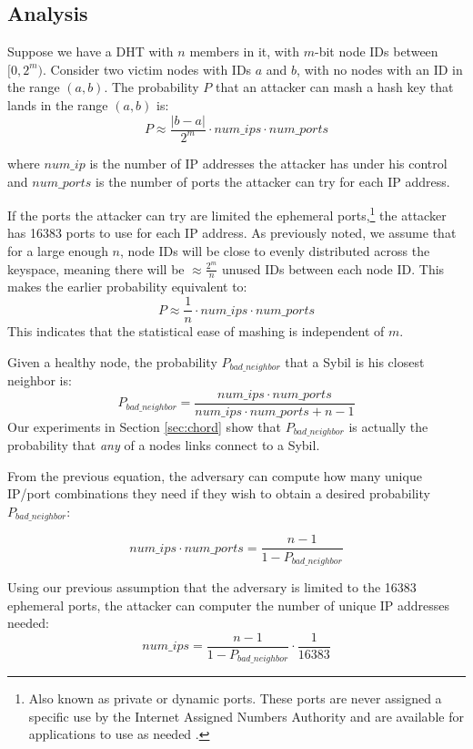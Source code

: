 \documentclass[11pt,conference]{IEEEtran}
\begin{document}
\subsection{Analysis}
Suppose we have a DHT with $n$ members in it, with $m$-bit node IDs between $[0,2^{m})$. 
Consider two victim nodes with IDs $a$ and $b$, with no nodes with an ID in the range $(a,b)$.
The probability $P$ that an attacker can mash a hash key that lands in the range $(a,b)$ is:
$$ P \approx \frac{|b-a|}{2^{m}}\cdot num\_ips \cdot num\_ports  $$

where $num\_ip$ is the number of IP addresses the attacker has under his control and $num\_ports$ is the number of ports the attacker can try for each IP address.

If the ports the attacker can try are limited the ephemeral ports,\footnote{Also known as private or dynamic ports.  These ports are never assigned a specific use by the Internet Assigned Numbers Authority  and are available for applications to use as needed \cite{cotton2011internet}.} the attacker has 16383 ports to use for each IP address.
As previously noted, we assume that for a large enough $n$, node IDs will be close to evenly distributed across the keyspace, meaning there will be $\approx \frac{2^{m}}{n}$ unused IDs between each node ID.
This makes the earlier probability equivalent to:
$$ P \approx \frac{1}{n}\cdot num\_ips \cdot num\_ports  $$
This indicates that the statistical ease of mashing is independent of $m$.

Given a healthy node, the probability $P_{bad\_neighbor}$ that a Sybil is his closest neighbor is:
\begin{equation}
P_{bad\_neighbor} =  \frac{num\_ips \cdot num\_ports}{num\_ips \cdot num\_ports + n - 1}
\label{eq:bad}
\end{equation}
Our experiments in Section \ref{sec:chord} show that $P_{bad\_neighbor}$ is actually the probability that \textit{any} of a nodes links connect to a Sybil.

From the previous equation, the adversary can compute how many unique IP/port combinations they need if they wish to obtain a desired probability $P_{bad\_neighbor}$:

$$ num\_ips \cdot num\_ports =  \frac{n - 1}{1 - P_{bad\_neighbor} }$$

Using our previous assumption that the adversary is limited to the 16383 ephemeral ports, the attacker can computer the number of unique IP addresses needed:
$$ num\_ips  =  \frac{n - 1}{1 - P_{bad\_neighbor} }  \cdot \frac{1}{16383}$$
\end{document}
